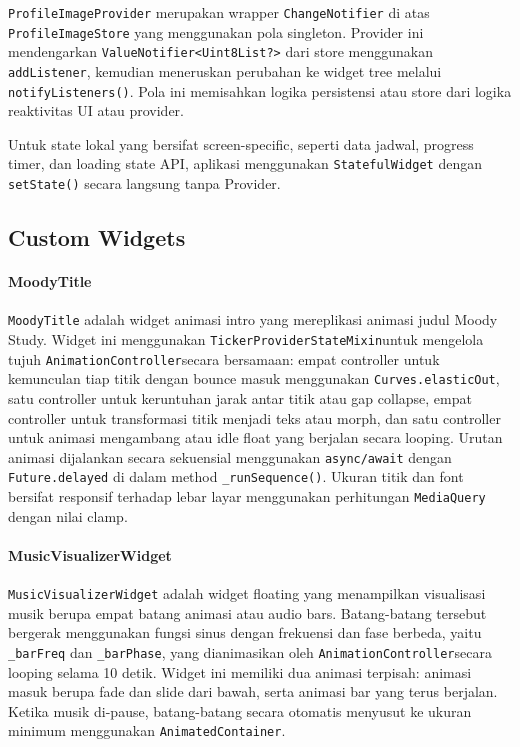 \documentclass[11pt]{article}
\begin{document}
\texttt{ProfileImageProvider} merupakan wrapper \texttt{ChangeNotifier} di atas \texttt{ProfileImageStore} yang menggunakan pola singleton. Provider ini mendengarkan \texttt{ValueNotifier<Uint8List?>} dari store menggunakan \texttt{addListener}, kemudian meneruskan perubahan ke widget tree melalui \texttt{notifyListeners()}. Pola ini memisahkan logika persistensi atau store dari logika reaktivitas UI atau provider.

Untuk state lokal yang bersifat screen-specific, seperti data jadwal, progress timer, dan loading state API, aplikasi menggunakan \texttt{StatefulWidget} dengan \texttt{setState()} secara langsung tanpa Provider.

\subsection{Custom Widgets}

\paragraph{MoodyTitle}

\texttt{MoodyTitle} adalah widget animasi intro yang mereplikasi animasi judul Moody Study. Widget ini menggunakan \texttt{TickerProviderStateMixin}\linebreak[1] untuk mengelola tujuh \texttt{AnimationController}\linebreak[1] secara bersamaan: empat controller untuk kemunculan tiap titik dengan bounce masuk menggunakan \texttt{Curves.elasticOut}, satu controller untuk keruntuhan jarak antar titik atau gap collapse, empat controller untuk transformasi titik menjadi teks atau morph, dan satu controller untuk animasi mengambang atau idle float yang berjalan secara looping. Urutan animasi dijalankan secara sekuensial menggunakan \texttt{async/await} dengan \texttt{Future.delayed} di dalam method \texttt{\_runSequence()}. Ukuran titik dan font bersifat responsif terhadap lebar layar menggunakan perhitungan \texttt{MediaQuery} dengan nilai clamp.

\paragraph{MusicVisualizerWidget}

\texttt{MusicVisualizerWidget} adalah widget floating yang menampilkan visualisasi musik berupa empat batang animasi atau audio bars. Batang-batang tersebut bergerak menggunakan fungsi sinus dengan frekuensi dan fase berbeda, yaitu \texttt{\_barFreq} dan \texttt{\_barPhase}, yang dianimasikan oleh \texttt{AnimationController}\linebreak[1] secara looping selama 10 detik. Widget ini memiliki dua animasi terpisah: animasi masuk berupa fade dan slide dari bawah, serta animasi bar yang terus berjalan. Ketika musik di-pause, batang-batang secara otomatis menyusut ke ukuran minimum menggunakan \texttt{AnimatedContainer}.
\end{document}
